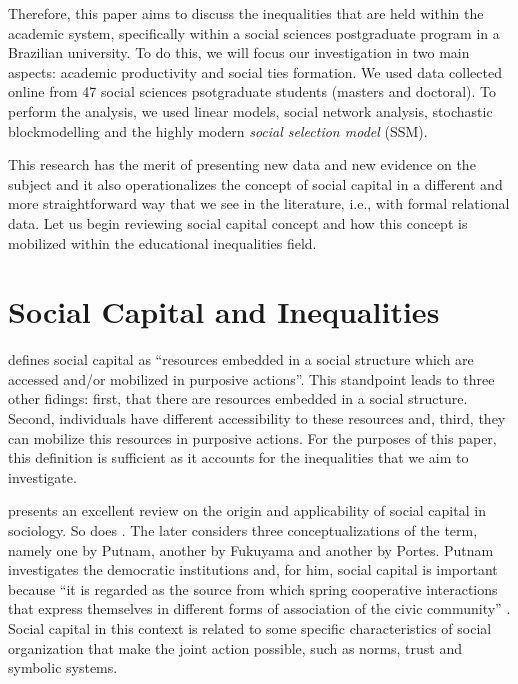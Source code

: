 \documentclass[a4paper, 12pt, openright, oneside, article, german, french, brazil, english]{abntex2}
\begin{document}
Therefore, this paper aims to discuss the inequalities that are held within the academic system, specifically within a social sciences postgraduate program in a Brazilian university. To do this, we will focus our investigation in two main aspects: academic productivity and social ties formation. We used data collected online from 47 social sciences psotgraduate students (masters and doctoral). To perform the analysis, we used linear models, social network analysis, stochastic blockmodelling and the highly modern \textit{social selection model} (SSM).

This research has the merit of presenting new data and new evidence on the subject and it also operationalizes the concept of social capital in a different and more straightforward way that we see in the literature, i.e., with formal relational data. Let us begin reviewing social capital concept and how this concept is mobilized within the educational inequalities field.


\section{Social Capital and Inequalities}

 defines social capital as ``resources embedded in a social structure which are accessed and/or mobilized in purposive actions''. This standpoint leads to three other fidings: first, that there are resources embedded in a social structure. Second, individuals have different accessibility to these resources and, third, they can mobilize this resources in purposive actions. For the purposes of this paper, this definition is sufficient as it accounts for the inequalities that we aim to investigate.

 presents an excellent review on the origin and applicability of social capital in sociology. So does . The later considers three conceptualizations of the term, namely one by Putnam, another by Fukuyama and another by Portes. Putnam investigates the democratic institutions and, for him, social capital is important because ``it is regarded as the source from which spring cooperative interactions that express themselves in different forms of association of the civic community'' \cite[p. 63]{higgins2005fundamentos}. Social capital in this context is related to some specific characteristics of social organization that make the joint action possible, such as norms, trust and symbolic systems.
\end{document}
